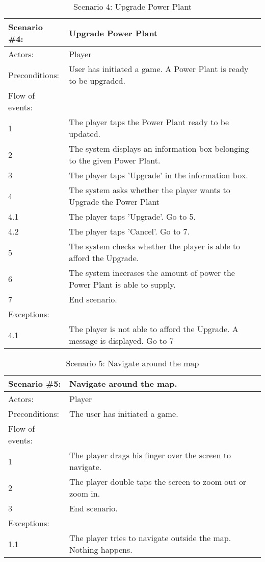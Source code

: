 \begin{table}
	\begin{tabular}{| l | p{10cm} |}
		\hline
		\rowcolor{lightgray}
		{\bf Scenario \#4:} & {\bf Upgrade Power Plant} \\ \hline
		Actors: & Player \\ \hline
		Preconditions: & User has initiated a game. A Power Plant is ready to be upgraded. \\ \hline
		\rowcolor{lightergray}
		Flow of events: & \\ \hline
		1 & The player taps the Power Plant ready to be updated. \\ \hline
		2 & The system displays an information box belonging to the given Power Plant. \\ \hline
		3 & The player taps 'Upgrade' in the information box. \\ \hline
		4 & The system asks whether the player wants to Upgrade the Power Plant \\ \hline
		4.1 & The player taps 'Upgrade'. Go to 5. \\ \hline
		4.2 & The player taps 'Cancel'. Go to 7. \\ \hline
		5 & The system checks whether the player is able to afford the Upgrade. \\ \hline
		6 & The system incerases the amount of power the Power Plant is able to supply. \\ \hline
		7 & End scenario. \\ \hline
		\rowcolor{lightergray}
		Exceptions: & \\ \hline
		4.1 & The player is not able to afford the Upgrade. A message is displayed. Go to 7 \\ \hline 
	\end{tabular}
\caption{Scenario 4: Upgrade Power Plant}
\end{table}

\begin{table}
	\begin{tabular}{| l | p{10cm} |}
		\hline
		\rowcolor{lightgray}
		{\bf Scenario \#5:} & {\bf Navigate around the map.} \\ \hline
		Actors: & Player \\ \hline
		Preconditions: & The user has initiated a game. \\ \hline
		\rowcolor{lightergray}
		Flow of events: & \\ \hline
		1 & The player drags his finger over the screen to navigate. \\ \hline
		2 & The player double taps the screen to zoom out or zoom in. \\ \hline
		3 & End scenario. \\ \hline
		\rowcolor{lightergray}
		Exceptions: & \\ \hline
		1.1 & The player tries to navigate outside the map. Nothing happens. \\ \hline
	\end{tabular}
	\caption{Scenario 5: Navigate around the map}
\end{table}

